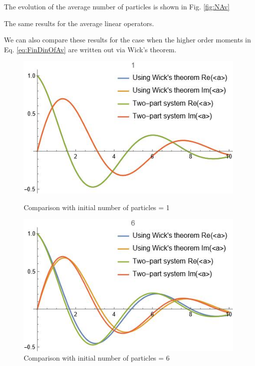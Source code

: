 \documentclass[12pt]{article}
\theoremstyle{definition}
\begin{document}
	The evolution of the average number of particles is shown in Fig. \ref{fig:NAv}
	
	The same results for the average linear operators.
	
	We can also compare these results for the case when the higher order moments in Eq. \ref{eq:FinDinOfAv} are written out via Wick's theorem.
	
	\begin{figure}[h!]
		\begin{center}
			\begin{minipage}[h]{0.45\linewidth}
				\includegraphics[width=1\linewidth]{Wickn0=1.JPG}
				\caption{Comparison with initial number of particles = 1}
				\label{fig:wick1}
			\end{minipage}
			\hfil
			\begin{minipage}[h]{0.45\linewidth}
				\includegraphics[width=1\linewidth]{Wickn0=6.JPG}
				\caption{Comparison with initial number of particles = 6}
				\label{fig:wick6}
			\end{minipage}
		\end{center}
	\end{figure}
\end{document}
